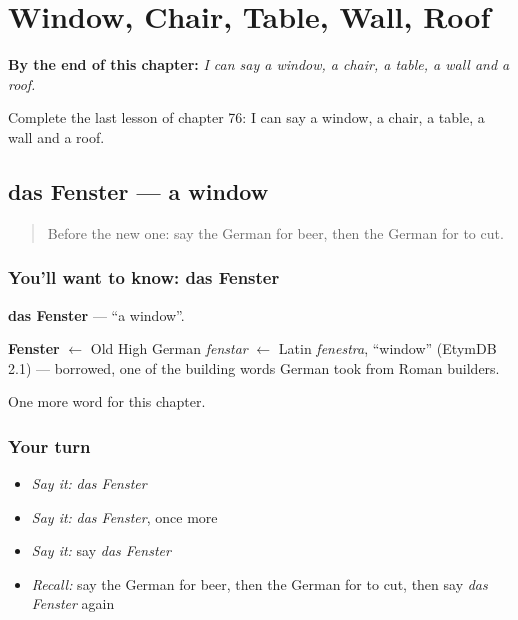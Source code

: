 
\chapter{Window, Chair, Table, Wall, Roof}
\label{ch:ge-window-chair-table-wall-roof}

\begin{chapteropening}
\textbf{By the end of this chapter:} \emph{I can say a window, a chair, a table, a wall and a roof.}

Complete the last lesson of chapter 76: I can say a window, a chair, a table, a wall and a roof.
\end{chapteropening}

\section[das Fenster]{das Fenster — a window}

\label{lesson:GE-C76-fenster}



\begin{quote}
Before the new one: say the German for beer, then the German for to cut.
\end{quote}

\subsection*{You'll want to know: das Fenster}
\textbf{das Fenster} — \textquotedblleft{}a window\textquotedblright{}.

\begin{cousinweb}
\textbf{Fenster} $\leftarrow$ Old High German \emph{fenstar} $\leftarrow$ Latin \emph{fenestra}, \textquotedblleft{}window\textquotedblright{} (EtymDB 2.1) — borrowed, one of the building words German took from Roman builders.
\end{cousinweb}

\begin{grammarlens}[title={What you've built}]
One more word for this chapter.
\end{grammarlens}

\subsection*{Your turn}
\begin{itemize}
\raggedright
  \item \emph{Say it:} \emph{das Fenster}
  \item \emph{Say it:} \emph{das Fenster}, once more
  \item \emph{Say it:} say \emph{das Fenster}
  \item \emph{Recall:} say the German for beer, then the German for to cut, then say \emph{das Fenster} again
\end{itemize}

